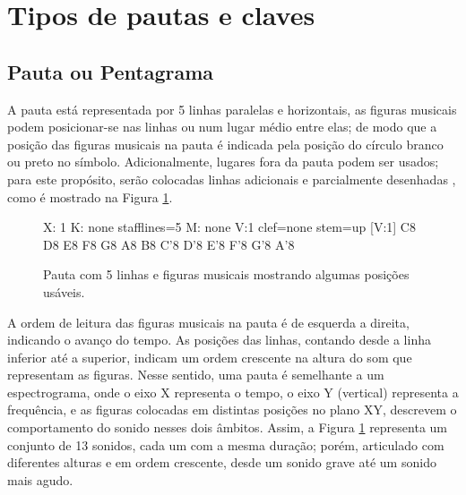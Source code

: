 \section{Tipos de pautas e claves}
\label{sec:tipospauta}

\subsection{Pauta ou Pentagrama}
\label{sec:pauta}
A pauta está representada por 5 linhas paralelas e horizontais, 
as figuras musicais podem posicionar-se nas linhas ou num lugar médio entre elas;
de modo que a posição das figuras musicais na pauta é indicada 
pela posição do círculo branco ou preto no símbolo.
Adicionalmente, lugares fora da pauta podem ser usados; 
para este propósito, serão colocadas linhas adicionais e parcialmente desenhadas \cite[pp. 10]{cardoso1973curso},
como é mostrado na Figura \ref{fig:abc-pauta5}.
\begin{figure}[H]
\centering
\begin{abc}[name=abc-pauta5]
%
X: 1 %
K: none stafflines=5 %
M: none %
V:1 clef=none stem=up %
%
[V:1] C8 D8 E8 F8 G8 A8 B8 C'8 D'8 E'8 F'8 G'8 A'8
\end{abc}
\caption{Pauta com 5 linhas e figuras musicais mostrando algumas posições usáveis.}
\label{fig:abc-pauta5}
\end{figure}
A ordem de leitura das figuras musicais na pauta é de esquerda a direita, 
indicando o avanço  do tempo.
As posições das linhas, contando desde a linha inferior até a superior, 
indicam um ordem crescente na altura do som que representam as figuras.
Nesse sentido, 
uma pauta é semelhante a um espectrograma, onde o eixo X representa o tempo,
o eixo Y (vertical) representa a frequência, e as figuras colocadas em distintas posições no plano XY, descrevem
o comportamento do sonido nesses dois âmbitos. Assim, a Figura \ref{fig:abc-pauta5}
representa um conjunto de 13 sonidos, cada um com a mesma duração; 
porém, articulado com diferentes alturas e em ordem crescente, 
desde um sonido grave até um sonido mais agudo.


